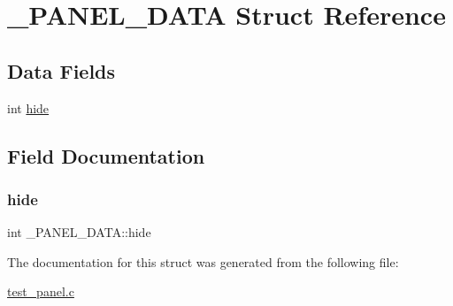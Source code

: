 \hypertarget{struct___p_a_n_e_l___d_a_t_a}{}\section{\+\_\+\+P\+A\+N\+E\+L\+\_\+\+D\+A\+TA Struct Reference}
\label{struct___p_a_n_e_l___d_a_t_a}
\subsection*{Data Fields}
\begin{DoxyCompactItemize}
\item 
int \mbox{\hyperlink{struct___p_a_n_e_l___d_a_t_a_a462fbda39cf0de1a64f7116fd7342463}{hide}}
\end{DoxyCompactItemize}


\subsection{Field Documentation}
\mbox{\label{struct___p_a_n_e_l___d_a_t_a_a462fbda39cf0de1a64f7116fd7342463}} 
\subsubsection{\texorpdfstring{hide}{hide}}
{\footnotesize\ttfamily int \+\_\+\+P\+A\+N\+E\+L\+\_\+\+D\+A\+T\+A\+::hide}



The documentation for this struct was generated from the following file\+:\begin{DoxyCompactItemize}
\item 
\mbox{\hyperlink{test__panel_8c}{test\+\_\+panel.\+c}}\end{DoxyCompactItemize}
